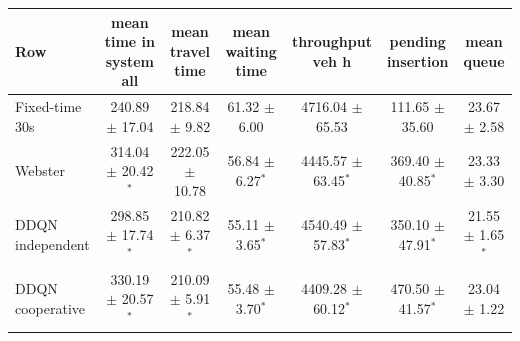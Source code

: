 \begin{tabular}{lcccccc}
\toprule
Row & mean time in system all & mean travel time & mean waiting time & throughput veh h & pending insertion & mean queue \\
\midrule
Fixed-time 30s & 240.89 $\pm$ 17.04 & 218.84 $\pm$ 9.82 & 61.32 $\pm$ 6.00 & 4716.04 $\pm$ 65.53 & 111.65 $\pm$ 35.60 & 23.67 $\pm$ 2.58 \\
Webster & 314.04 $\pm$ 20.42$^{*}$ & 222.05 $\pm$ 10.78 & 56.84 $\pm$ 6.27$^{*}$ & 4445.57 $\pm$ 63.45$^{*}$ & 369.40 $\pm$ 40.85$^{*}$ & 23.33 $\pm$ 3.30 \\
DDQN independent & 298.85 $\pm$ 17.74$^{*}$ & 210.82 $\pm$ 6.37$^{*}$ & 55.11 $\pm$ 3.65$^{*}$ & 4540.49 $\pm$ 57.83$^{*}$ & 350.10 $\pm$ 47.91$^{*}$ & 21.55 $\pm$ 1.65$^{*}$ \\
DDQN cooperative & 330.19 $\pm$ 20.57$^{*}$ & 210.09 $\pm$ 5.91$^{*}$ & 55.48 $\pm$ 3.70$^{*}$ & 4409.28 $\pm$ 60.12$^{*}$ & 470.50 $\pm$ 41.57$^{*}$ & 23.04 $\pm$ 1.22 \\
\bottomrule
\end{tabular}
